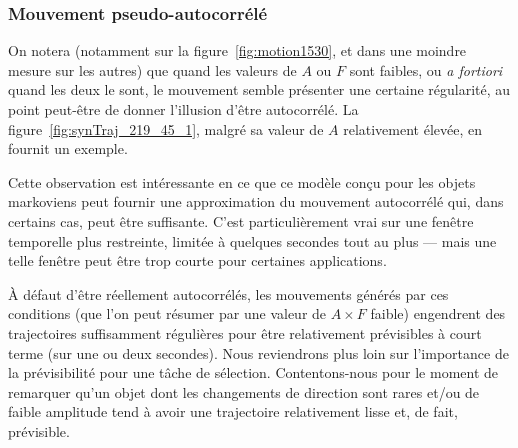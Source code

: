 	\FloatBarrier \subsubsection{Mouvement pseudo-autocorrélé}
	On notera (notamment sur la figure~\ref{fig:motion1530}, et dans une moindre mesure sur les autres) que quand les valeurs de $A$ ou $F$ sont faibles, ou \emph{a fortiori} quand les deux le sont, le mouvement semble présenter une certaine régularité, au point peut-être de donner l'illusion d'être autocorrélé. La figure~\ref{fig:synTraj_219_45_1}, malgré sa valeur de $A$ relativement élevée, en fournit un exemple.
	
	Cette observation est intéressante en ce que ce modèle conçu pour les objets markoviens peut fournir une approximation du mouvement autocorrélé qui, dans certains cas, peut être suffisante. C'est particulièrement vrai sur une fenêtre temporelle plus restreinte, limitée à quelques secondes tout au plus --- mais une telle fenêtre peut être trop courte pour certaines applications.
	
	À défaut d'être réellement autocorrélés, les mouvements générés par ces conditions (que l'on peut résumer par une valeur de $A \times F$ faible) engendrent des trajectoires suffisamment \og régulières \fg{} pour être relativement prévisibles à court terme (sur une ou deux secondes). Nous reviendrons plus loin sur l'importance de la prévisibilité pour une tâche de sélection. Contentons-nous pour le moment de remarquer qu'un objet dont les changements de direction sont rares et/ou de faible amplitude tend à avoir une trajectoire relativement \og lisse \fg{} et, de fait, prévisible.


